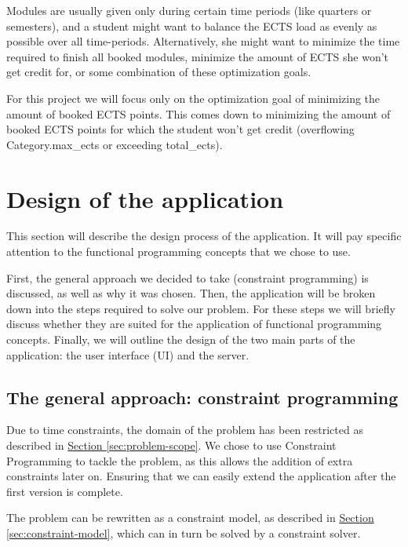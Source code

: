 \documentclass[a4paper]{article}
\begin{document}
Modules are usually given only during certain time periods (like quarters or semesters),
and a student might want to balance the ECTS load as evenly as possible over all time-periods.
Alternatively, she might want to minimize the time required to finish all booked modules, 
minimize the amount of ECTS she won't get credit for, 
or some combination of these optimization goals.

For this project we will focus only on the optimization goal of minimizing the amount of booked ECTS points.
This comes down to minimizing the amount of booked ECTS points for which the student won't get credit (overflowing Category.max\_ects or exceeding total\_ects).


\newpage


\section{Design of the application}
\label{sec:design}
This section will describe the design process of the application.
It will pay specific attention to the functional programming concepts that we
chose to use.

First, the general approach we decided to take (constraint programming) is discussed,
as well as why it was chosen.
Then, the application will be broken down into the steps required to solve our problem.
For these steps we will briefly discuss whether they are suited for the application
of functional programming concepts.
Finally, we will outline the design of the two main parts of the application:
the user interface (UI) and the server.


\subsection{The general approach: constraint programming}
\label{sec:general-approach}
Due to time constraints, the domain of the problem has been restricted as described in
\hyperref[sec:problem-scope]{Section \ref*{sec:problem-scope}}.
We chose to use Constraint Programming to tackle the problem, 
as this allows the addition of extra constraints later on.
Ensuring that we can easily extend the application after the first version is complete.

The problem can be rewritten as a constraint model, as described in 
\hyperref[sec:constraint-model]{Section \ref*{sec:constraint-model}}, which can in turn be solved by a constraint solver.
\end{document}
